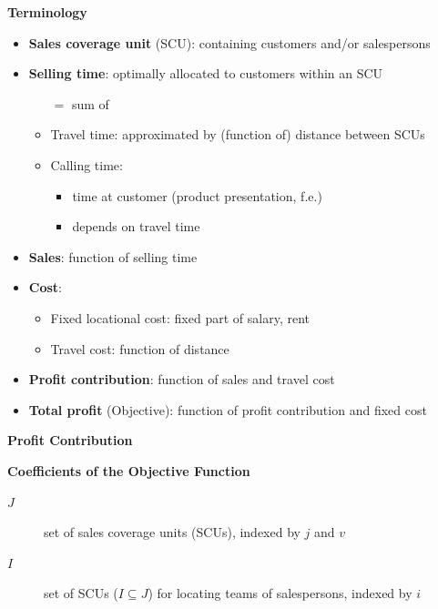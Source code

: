 \begin{frame}{\textbf{Terminology}}
\begin{itemize}
	\item \textbf{Sales coverage unit} (SCU): containing customers and/or salespersons
\end{itemize}
	\begin{itemize}[<+->]
	\item \textbf{Selling time}: optimally allocated to customers within an SCU
	\begin{itemize}
	  \item[$=$] sum of 
		\item Travel time: approximated by (function of) distance between SCUs
	  \item Calling time: 
		\begin{itemize}
			\item time at customer (product presentation, f.e.) 
			\item depends on travel time
		\end{itemize}
	\end{itemize}	
	\item \textbf{Sales}: function of selling time
	\item \textbf{Cost}:
	\begin{itemize}
	\item Fixed locational cost: fixed part of salary, rent
	\item Travel cost: function of distance
	\end{itemize}
	\item \textbf{Profit contribution}: function of sales and travel cost
	\item \textbf{Total profit} (Objective): function of profit contribution and fixed cost
\end{itemize}
\end{frame}


\begin{frame}
\begin{center}
{\LARGE \textbf{Profit Contribution}}
\end{center}
\end{frame}

\begin{frame}{\textbf{Coefficients of the Objective Function}}
\begin{description}
	\item[$J$]       set of sales coverage units (SCUs), indexed by $j$ and $v$
  \item[$I$]       set of SCUs ($I \subseteq J$) for locating teams of salespersons, indexed by $i$
\end{description}
\begin{center}

\end{center}

\end{frame}

